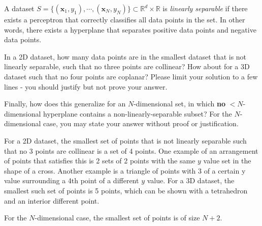 \begin{problem}[4]
  A dataset $S = \{(\mathbf{x}_1, y_1),\cdots,(\mathbf{x}_N, y_N)\} \subset \mathbb{R}^d \times \mathbb{R}$ is \emph{linearly separable} if there exists a perceptron that correctly classifies all data points in the set. In other words, there exists a hyperplane that separates positive data points and negative data points.

  In a 2D dataset, how many data points are in the smallest dataset that is not linearly separable, such that no three points are collinear? How about for a 3D dataset such that no four points are coplanar? Please limit your solution to a few lines - you should justify but not prove your answer.

  Finally, how does this generalize for an $N$-dimensional set, in which \textbf{no} $<$$N$-dimensional hyperplane contains a non-linearly-separable subset? For the $N$-dimensional case, you may state your answer without proof or justification.
\end{problem}
\begin{solution}
  For a 2D dataset, the smallest set of points that is not linearly separable such that no 3 points are collinear is a set of 4 points. One example of an arrangement of points that satisfies this is 2 sets of 2 points with the same $y$ value set in the shape of a cross. Another example is a triangle of points with 3 of a certain y value surrounding a 4th point of a different $y$ value. For a 3D dataset, the smallest such set of points is 5 points, which can be shown with a tetrahedron and an interior different point.

  For the $N$-dimensional case, the smallest set of points is of size $N+2$.
\end{solution}

\newpage

